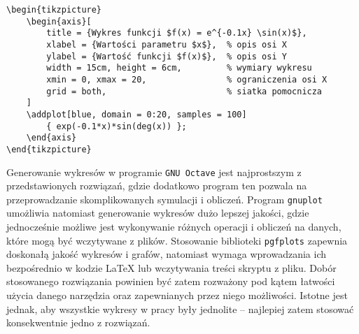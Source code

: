 \begin{listing}[ht!]
\begin{verbatim}
\begin{tikzpicture}
	\begin{axis}[
		title = {Wykres funkcji $f(x) = e^{-0.1x} \sin(x)$},
		xlabel = {Wartości parametru $x$},  % opis osi X
		ylabel = {Wartość funkcji $f(x)$},  % opis osi Y
		width = 15cm, height = 6cm,         % wymiary wykresu
		xmin = 0, xmax = 20,                % ograniczenia osi X
		grid = both,                        % siatka pomocnicza
	]
	\addplot[blue, domain = 0:20, samples = 100]
		{ exp(-0.1*x)*sin(deg(x)) };
	\end{axis}
\end{tikzpicture}
\end{verbatim}
\end{listing}

Generowanie wykresów w programie \texttt{GNU Octave} jest najprostszym z przedstawionych rozwiązań, gdzie dodatkowo program ten pozwala na przeprowadzanie skomplikowanych symulacji i obliczeń. Program \texttt{gnuplot} umożliwia natomiast generowanie wykresów dużo lepszej jakości, gdzie jednocześnie możliwe jest wykonywanie różnych operacji i obliczeń na danych, które mogą być wczytywane z plików. Stosowanie biblioteki \texttt{pgfplots} zapewnia doskonałą jakość wykresów i grafów, natomiast wymaga wprowadzania ich bezpośrednio w kodzie \LaTeX{} lub wczytywania treści skryptu z pliku. Dobór stosowanego rozwiązania powinien być zatem rozważony pod kątem łatwości użycia danego narzędzia oraz zapewnianych przez niego możliwości. Istotne jest jednak, aby wszystkie wykresy w pracy były jednolite -- najlepiej zatem stosować konsekwentnie jedno z rozwiązań.
